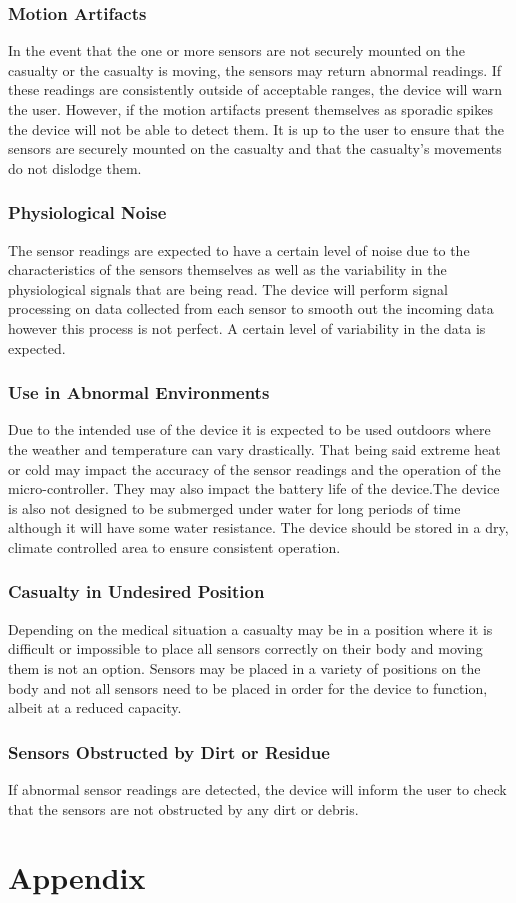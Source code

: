 \documentclass{article}
\begin{document}
	\subsubsection{Motion Artifacts}
	In the event that the one or more sensors are not securely mounted on the casualty or the casualty is moving, the sensors may return abnormal readings. If these readings are consistently outside of acceptable ranges, the device will warn the user.  However, if the motion artifacts present themselves as sporadic spikes the device will not be able to detect them. It is up to the user to ensure that the sensors are securely mounted on the casualty and that the casualty's movements do not dislodge them.

	\subsubsection{Physiological Noise}
	The sensor readings are expected to have a certain level of noise due to the characteristics of the sensors themselves as well as the variability in the physiological signals that are being read. The device will perform signal processing on data collected from each sensor to smooth out the incoming data however this process is not perfect. A certain level of variability in the data is expected.
	
	\subsubsection{Use in Abnormal Environments}
	Due to the intended use of the device it is expected to be used outdoors where the weather and temperature can vary drastically. That being said extreme heat or cold may impact the accuracy of the sensor readings and the operation of the micro-controller. They may also impact the battery life of the device.The device is also not designed to be submerged under water for long periods of time although it will have some water resistance. The device should be stored in a dry, climate controlled area to ensure consistent operation. 
	
    \subsubsection{Casualty in Undesired Position}
    Depending on the medical situation a casualty may be in a position where it is difficult or impossible to place all sensors correctly on their body and moving them is not an option. Sensors may be placed in a variety of positions on the body and not all sensors need to be placed in order for the device to function, albeit at a reduced capacity. 
    
    \subsubsection{Sensors Obstructed by Dirt or Residue }
    If abnormal sensor readings are detected, the device will inform the user to check that the sensors are not obstructed by any dirt or debris. 
	
	
	\newpage
	\section{Appendix}
	
	
    
\end{document}
